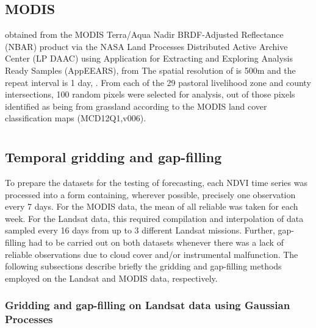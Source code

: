 \documentclass[review]{elsarticle}
\begin{document}
\subsection{MODIS}
 obtained from the MODIS Terra/Aqua Nadir BRDF-Adjusted Reflectance (NBAR) product \citep[MCD43A4,v006;][]{Schaaf2015} via the NASA Land Processes Distributed Active Archive Center (LP DAAC) using Application for Extracting and Exploring Analysis Ready Samples (AppEEARS), from  The spatial resolution of  is 500m and the repeat interval is 1 day, . From each of the 29 pastoral livelihood zone and county intersections, 100 random pixels were selected for analysis, out of those pixels identified as being from grassland according to the MODIS land cover classification maps (MCD12Q1,v006).

\section{}

\subsection{Temporal gridding and gap-filling} \label{gap}
To prepare the datasets for the testing of forecasting, each NDVI time series was processed into a form containing, wherever possible, precisely one observation every 7 days. For the MODIS data, the mean of all reliable  was taken for each week. For the Landsat data, this required compilation and interpolation of data sampled every 16 days from up to 3 different Landsat missions. Further, gap-filling had to be carried out on both datasets whenever there was a lack of reliable observations due to cloud cover and/or instrumental malfunction. The following subsections describe briefly the gridding and gap-filling methods employed on the Landsat and MODIS data, respectively. 

\subsubsection{Gridding and gap-filling on Landsat data using Gaussian Processes}
\end{document}
